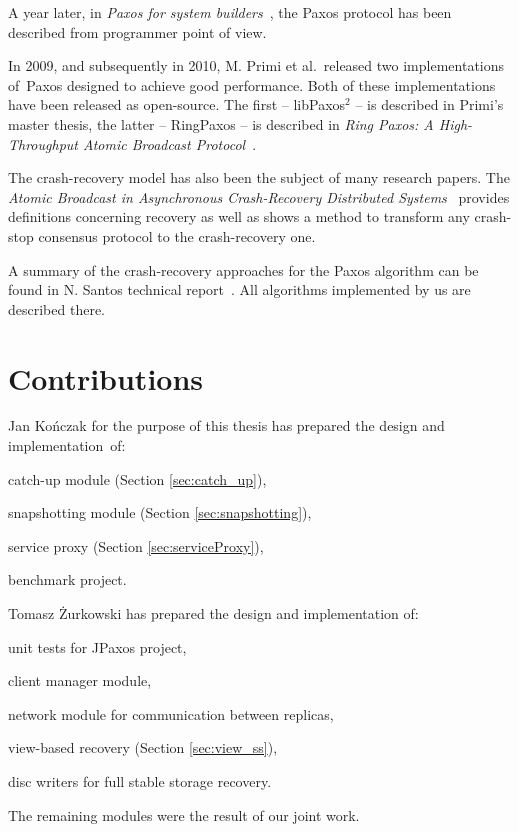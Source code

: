 A year later, in \textit{Paxos for system builders}~\cite{AK08}, the Paxos protocol has been described from programmer point of view.

In 2009, and subsequently in 2010, M. Primi et al.\ released two implementations of~Paxos designed to achieve good performance. Both of these implementations have been released as open-source. The first -- libPaxos$^2$ -- is described in Primi's master thesis, the latter -- RingPaxos -- is described in \textit{Ring Paxos: A High-Throughput Atomic Broadcast Protocol}~\cite{Mar10}.

The crash-recovery model has also been the subject of many research papers. \linebreak The \textit{Atomic Broadcast in Asynchronous Crash-Recovery Distributed Systems}~\cite{rodriguez2000atomic} provides definitions concerning recovery as well as shows a method to transform any crash-stop consensus protocol to the crash-recovery one.

A summary of the crash-recovery approaches for the Paxos algorithm can be found in N. Santos technical report~\cite{Nun10}. All algorithms implemented by us are described there.

\section{Contributions}

Jan Kończak for the purpose of this thesis has prepared the design and implementation~of:
\begin{tightList}
  \item[\textbullet] catch-up module (Section \ref{sec:catch_up}),
  \item[\textbullet] snapshotting module (Section \ref{sec:snapshotting}),
  \item[\textbullet] service proxy  (Section \ref{sec:serviceProxy}),
  \item[\textbullet] benchmark project.
\end{tightList}

\noindent Tomasz Żurkowski has prepared the design and implementation of:
\begin{tightList}
  \item[\textbullet] unit tests for JPaxos project,
  \item[\textbullet] client manager module, 
  \item[\textbullet] network module for communication between replicas,
  \item[\textbullet] view-based recovery (Section \ref{sec:view_ss}),
  \item[\textbullet] disc writers for full stable storage recovery.
\end{tightList}

\noindent The remaining modules were the result of our joint work.
